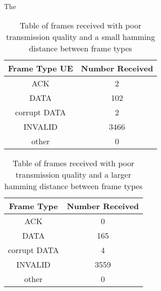 The 

\begin{table}
	\centering
		\begin{tabular}{| c | c | }
		\hline                       
		Frame Type UE & Number Received\\
		\hline
			ACK & 2\\
			DATA & 102\\
			corrupt DATA & 2\\
			INVALID & 3466\\
			other & 0\\
		\hline
		\end{tabular}
	\caption{Table of frames received with poor transmission quality and a small hamming distance between frame types}
	\label{tab:2ACK}
\end{table}

\begin{table}
	\centering
		\begin{tabular}{| c | c | }
		\hline                       
		Frame Type & Number Received\\
		\hline
			ACK & 0\\
			DATA & 165\\
			corrupt DATA & 4\\
			INVALID & 3559\\
			other & 0\\
		\hline
		\end{tabular}
	\caption{Table of frames received with poor transmission quality and a larger hamming distance between frame types}
	\label{tab:0ACK}
\end{table}